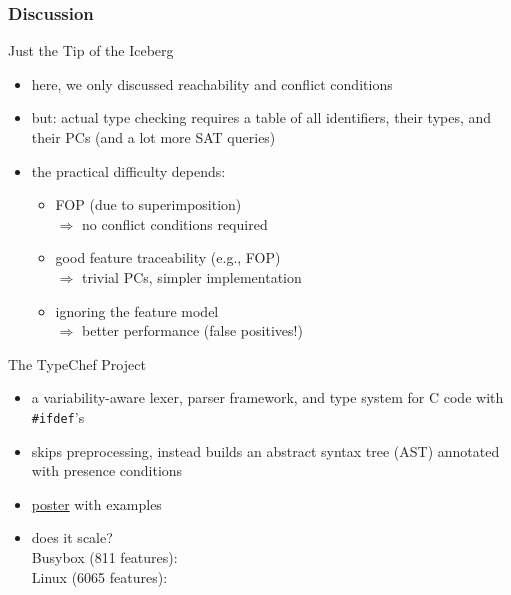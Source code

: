 \subsubsection{Discussion}

\begin{frame}{\myframetitle}
	\begin{fancycolumns}
		\begin{note}{Just the Tip of the Iceberg}
			\begin{itemize}
				\item here, we only discussed reachability and conflict conditions
				\item but: actual type checking requires a table of all identifiers, their types, and their PCs (and a lot more SAT queries)
				\item the practical difficulty depends:
				\begin{itemize}
					\item FOP (due to superimposition)\\
						$\Rightarrow$ no conflict conditions required
					\item good feature traceability (e.g., FOP)\\
						$\Rightarrow$ trivial PCs, simpler implementation
					\item ignoring the feature model\\
						$\Rightarrow$ better performance (false positives!)
				\end{itemize}
			\end{itemize}
		\end{note}
	\nextcolumn
		\begin{example}{The TypeChef Project \mysource{\typechef}}
			\begin{itemize}
				\item a variability-aware lexer, parser framework, and type system for C code with \texttt{\#ifdef}'s
				\item skips preprocessing, instead builds an abstract syntax tree (AST) annotated with presence conditions
				\item \href{https://ckaestne.github.io/TypeChef/typechef-poster.png}{poster} with examples
				\item does it scale?\\[1ex]
				{\small Busybox (811 features): } \\[1ex]
				{\small Linux (6065 features): }  %
			\end{itemize}
		\end{example}
	\end{fancycolumns}
\end{frame}

